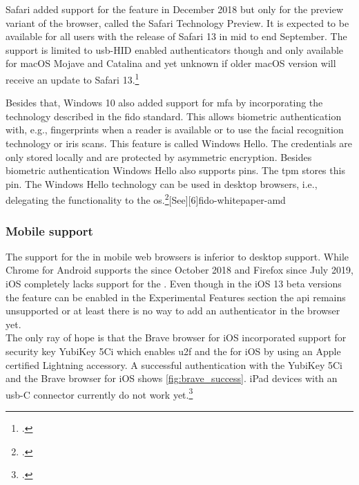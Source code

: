 Safari added support for the \wa{} feature in December 2018 but only for the preview variant of the browser, called the Safari Technology Preview. It is expected to be available for all users with the release of Safari 13 in mid to end September. The support is limited to \gls{usb}-HID enabled authenticators though and only available for macOS Mojave and Catalina and yet unknown if older macOS version will receive an update to Safari 13.\footcites[See][]{safari-webauthn}

Besides that, Windows 10 also added support for \gls{mfa} by incorporating the technology described in the \gls{fido} standard. This allows biometric authentication with, e.g., fingerprints when a reader is available or to use the facial recognition technology or iris scans. This feature is called \frqq Windows Hello\flqq{}. The credentials are only stored locally and are protected by asymmetric encryption. Besides biometric authentication Windows Hello also supports \glspl{pin}. The \gls{tpm} stores this \gls{pin}. The Windows Hello technology can be used in desktop browsers, i.e., delegating the \wa{} functionality to the \gls{os}.\footcite[See][]{201612}[See][6]{fido-whitepaper-amd}

\subsubsection{Mobile support}

The support for the \wa{} in mobile web browsers is inferior to desktop support. While Chrome for Android supports the \wa{} since October 2018 and Firefox since July 2019, iOS completely lacks support for the \wa. Even though in the iOS 13 beta versions the feature can be enabled in the \frqq Experimental Features\flqq{} section the \gls{api} remains unsupported or at least there is no way to add an authenticator in the browser yet.\\
The only ray of hope is that the Brave browser for iOS incorporated support for security key \frqq YubiKey 5Ci\flqq{} which enables \gls{u2f} and the \wa{} for iOS by using an Apple certified Lightning accessory. A successful authentication with the YubiKey 5Ci and the Brave browser for iOS shows \autoref{fig:brave_success}. iPad devices with an \gls{usb}-C connector currently do not work yet.\footcites[See][]{brave-ios}[See][]{brave-now-available}[See][]{fido-ct-6}

